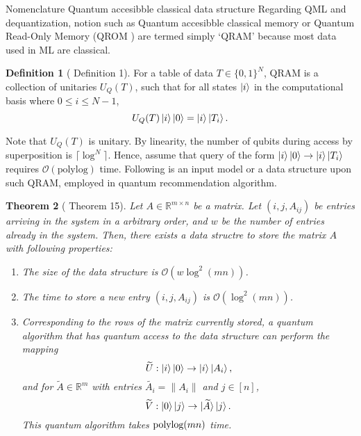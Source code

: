 \documentclass[10pt,twoside,reqno]{amsart} %
\makeatletter
\renewcommand{\section}{\@startsection{section}{1}
   \z@{.7\linespacing\@plus\linespacing}{.5\linespacing}
   {\normalfont\upshape\bfseries\centering}}
\theoremstyle{plain}
\newtheorem{thm}{Theorem}[section]
\theoremstyle{definition}
\newtheorem{defn}[thm]{Definition}
\makeatother
\begin{document}
\section{Nomenclature}
\section{Quantum accesibble classical data structure}
Regarding QML and dequantization, notion such as Quantum accesibble classical
memory or Quantum Read-Only Memory (QROM \cite{babbush2018}) are termed simply
`QRAM' because most data used in ML are classical. 

\begin{defn}[\cite{jaques2023} Definition 1]
  For a table of data $T\in\{0,1\}^N$, 
  QRAM is a collection of unitaries $U_Q(T)$,
  such that for all states $\ket{i}$ in the computational basis
  where $0\leq i\leq N-1$, 
  \[
    U_Q(T)\ket{i}\ket{0} = \ket{i}\ket{T_i}.
  \]
\end{defn}
Note that $U_Q(T)$ is unitary. By linearity, the number of qubits during access
by superposition is $\lceil\log^N\rceil$. Hence, assume that query of the
form $\ket{i}\ket{0}\rightarrow\ket{i}\ket{T_i}$ requires 
$\mathcal{O}(\textrm{polylog})$ time. Following is an input model or a data
structure upon such QRAM, employed in quantum recommendation algorithm.
\begin{thm}[\cite{kerenidis2017} Theorem 15]
  Let $A\in\mathbb{R}^{m\times n}$ be a matrix. Let $(i,j,A_{ij})$ be 
  entries arriving in the system in a arbitrary order, and $w$ be the
  number of entries already in the system. Then, there exists a data structre
  to store the matrix $A$ with following properties:
  \begin{enumerate}
    \item The size of the data structure is $\mathcal{O}(w\log^2(mn))$.
    \item The time to store a new entry $(i,j,A_{ij})$ is 
      $\mathcal{O}(\log^2(mn))$.
    \item Corresponding to the rows of the matrix currently stored,
      a quantum algorithm that has quantum access to the data structure
      can perform the mapping 
      \[
        \widetilde{U}:\ket{i}\ket{0}\rightarrow\ket{i}\ket{A_i},
      \]
      and for $\widetilde{A}\in\mathbb{R}^m$ with entries 
      $\widetilde{A_i}=\|A_i\|$ and $j\in[n]$,
      \[
        \widetilde{V}:\ket{0}\ket{j}\rightarrow\ket{\widetilde{A}}\ket{j}.
      \]
      This quantum algorithm takes $\textrm{\normalfont polylog}(mn)$ time.
  \end{enumerate}
\end{thm}
\end{document}
